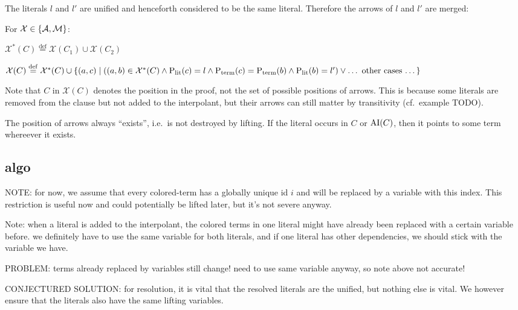 \documentclass[,%
	paper=a4,%
	DIV14, %
	twoside=false,%
	liststotoc,
	bibtotoc,
	draft=false,%
	numbers=noendperiod
]{scrartcl}
\begin{document}
\begin{enumerate}
		The literals $l$ and $l'$ are unified and henceforth considered to be the same literal.
		Therefore the arrows of $l$ and $l'$ are merged:

		For $\mathcal{X} \in \{\operatorname{\mathcal{A}}, \operatorname{\operatorname{\mathcal{M}}}\}$:

		$\mathcal{X}^*(C) \stackrel{\operatorname{def}}{=} \mathcal{X}(C_1) \cup \mathcal{X}(C_2)$

		$\mathcal{X}(C) \stackrel{\operatorname{def}}{=} \mathcal{X}^*(C) \cup \{(a,c) \mid ((a,b)\in\mathcal{X}^*(C) \land \operatorname{\operatorname{{\operatorname P}}_\mathrm{lit}}(c) = l \land \operatorname{\operatorname{{\operatorname P}}_\mathrm{term}}(c) = \operatorname{\operatorname{{\operatorname P}}_\mathrm{term}}(b) \land \operatorname{\operatorname{{\operatorname P}}_\mathrm{lit}}(b) = l') \lor \text{\dots~other cases \dots}\}$

		Note that $C$ in $\mathcal{X}(C)$ denotes the position in the proof, not the set of possible positions of arrows.
		This is because some literals are removed from the clause but not added to the interpolant, but their arrows can still matter by transitivity (cf.~example TODO).

\end{enumerate}

\begin{conj}
	The position of arrows always ``exists'', i.e.~is not destroyed by lifting. If the literal occurs in $C$ or $\operatorname{AI}(C)$, then it points to some term whereever it exists.
\end{conj}

\subsection{algo}

NOTE: for now, we assume that every colored-term has a globally unique id $i$ and will be replaced by a variable with this index. 
This restriction is useful now and could potentially be lifted later, but it's not severe anyway.

Note: when a literal is added to the interpolant, the colored terms in one literal might have already been replaced with a certain variable before. we definitely have to use the same variable for both literals, and if one literal has other dependencies, we should stick with the variable we have.

PROBLEM: terms already replaced by variables still change! need to use same variable anyway, so note above not accurate!

CONJECTURED SOLUTION: for resolution, it is vital that the resolved literals are the unified, but nothing else is vital. We however ensure that the literals also have the same lifting variables.   
\end{document}
